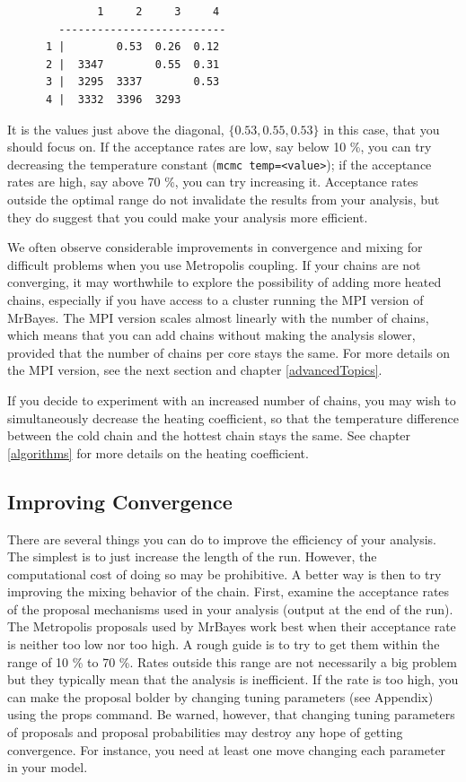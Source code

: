 \documentclass[12pt]{book}
\begin{document}
\small
\begin{singlespacing}
\begin{verbatim}
              1     2     3     4 
        --------------------------
      1 |        0.53  0.26  0.12 
      2 |  3347        0.55  0.31 
      3 |  3295  3337        0.53 
      4 |  3332  3396  3293       
\end{verbatim}
\end{singlespacing}
\normalsize

It is the values just above the diagonal, $\{0.53, 0.55, 0.53\}$ in this case, that you should
focus on. If the acceptance rates are low, say below 10 \%, you can try decreasing the temperature
constant (\texttt{mcmc temp=<value>}); if the acceptance rates are high, say above 70 \%, you can
try increasing it.  Acceptance rates outside the optimal range do not invalidate the results from
your analysis, but they do suggest that you could make your analysis more efficient.

We often observe considerable improvements in convergence and mixing for difficult problems when
you use Metropolis coupling. If your chains are not converging, it may worthwhile to explore the
possibility of adding more heated chains, especially if you have access to a cluster running the
MPI version of MrBayes.  The MPI version scales almost linearly with the number of chains, which
means that you can add chains without making the analysis slower, provided that the number of
chains per core stays the same. For more details on the MPI version, see the next section and
chapter \ref{advancedTopics}.

If you decide to experiment with an increased number of chains, you may wish to simultaneously
decrease the heating coefficient, so that the temperature difference between the cold chain and the
hottest chain stays the same. See chapter \ref{algorithms} for more details on the heating
coefficient.


\subsection{Improving Convergence}
There are several things you can do to improve the efficiency of your analysis. The simplest is to
just increase the length of the run. However, the computational cost of doing so may be
prohibitive. A better way is then to try improving the mixing behavior of the chain. First, examine
the acceptance rates of the proposal mechanisms used in your analysis (output at the end of the
run). The Metropolis proposals used by MrBayes work best when their acceptance rate is neither too
low nor too high. A rough guide is to try to get them within the range of 10 \% to 70 \%. Rates
outside this range are not necessarily a big problem but they typically mean that the analysis is
inefficient. If the rate is too high, you can make the proposal bolder by changing tuning
parameters (see Appendix) using the props command. Be warned, however, that changing tuning
parameters of proposals and proposal probabilities may destroy any hope of getting convergence. For
instance, you need at least one move changing each parameter in your model.
\end{document}
